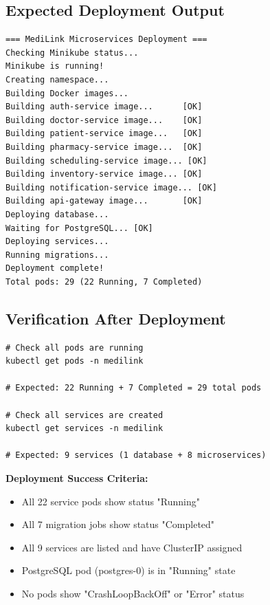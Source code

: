 \documentclass[12pt,a4paper]{article}
\begin{document}
\subsection{Expected Deployment Output}
\begin{lstlisting}[style=bash]
=== MediLink Microservices Deployment ===
Checking Minikube status...
Minikube is running!
Creating namespace...
Building Docker images...
Building auth-service image...      [OK]
Building doctor-service image...    [OK]
Building patient-service image...   [OK]
Building pharmacy-service image...  [OK]
Building scheduling-service image... [OK]
Building inventory-service image... [OK]
Building notification-service image... [OK]
Building api-gateway image...       [OK]
Deploying database...
Waiting for PostgreSQL... [OK]
Deploying services...
Running migrations...
Deployment complete!
Total pods: 29 (22 Running, 7 Completed)
\end{lstlisting}

\subsection{Verification After Deployment}
\begin{lstlisting}[style=bash]
# Check all pods are running
kubectl get pods -n medilink

# Expected: 22 Running + 7 Completed = 29 total pods

# Check all services are created
kubectl get services -n medilink

# Expected: 9 services (1 database + 8 microservices)
\end{lstlisting}

\begin{successbox}
\textbf{Deployment Success Criteria:}
\begin{itemize}
    \item All 22 service pods show status "Running"
    \item All 7 migration jobs show status "Completed"
    \item All 9 services are listed and have ClusterIP assigned
    \item PostgreSQL pod (postgres-0) is in "Running" state
    \item No pods show "CrashLoopBackOff" or "Error" status
\end{itemize}
\end{successbox}

\end{document}

